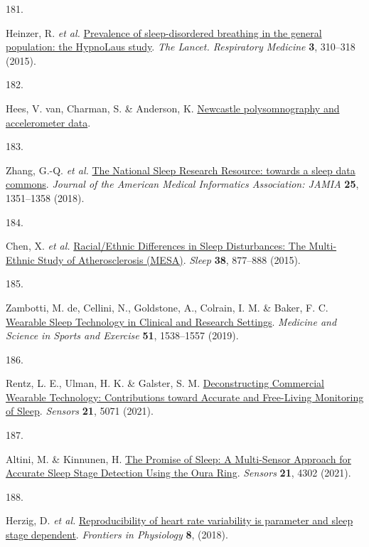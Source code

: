 \documentclass[
  10pt,
]{scrbook}
\newlength{\cslhangindent}
\newlength{\csllabelwidth}
\newlength{\cslentryspacingunit} %
\newenvironment{CSLReferences}[2] %
 {%
  \setlength{\parindent}{0pt}
  \ifodd #1
  \let\oldpar\par
  \def\par{\hangindent=\cslhangindent\oldpar}
  \fi
  \setlength{\parskip}{#2\cslentryspacingunit}
 }%
 {}
\newcommand{\CSLLeftMargin}[1]{\parbox[t]{\csllabelwidth}{#1}}
\newcommand{\CSLRightInline}[1]{\parbox[t]{\linewidth - \csllabelwidth}{#1}\break}
\let\originaltextbf\textbf
\renewcommand{\textbf}[1]{\textcolor{color1}{\textsf{\originaltextbf{#1}}}}
\begin{document}
\begin{CSLReferences}{0}{0}
\leavevmode{}%
\CSLLeftMargin{181. }%
\CSLRightInline{Heinzer, R. \emph{et al.}
\href{https://doi.org/10.1016/S2213-2600(15)00043-0}{Prevalence of
sleep-disordered breathing in the general population: the HypnoLaus
study}. \emph{The Lancet. Respiratory Medicine} \textbf{3}, 310--318
(2015).}

\leavevmode{}%
\CSLLeftMargin{182. }%
\CSLRightInline{Hees, V. van, Charman, S. \& Anderson, K.
\href{https://doi.org/10.5281/zenodo.1160410}{Newcastle polysomnography
and accelerometer data}.}

\leavevmode{}%
\CSLLeftMargin{183. }%
\CSLRightInline{Zhang, G.-Q. \emph{et al.}
\href{https://doi.org/10.1093/jamia/ocy064}{The National Sleep Research
Resource: towards a sleep data commons}. \emph{Journal of the American
Medical Informatics Association: JAMIA} \textbf{25}, 1351--1358 (2018).}

\leavevmode{}%
\CSLLeftMargin{184. }%
\CSLRightInline{Chen, X. \emph{et al.}
\href{https://doi.org/10.5665/sleep.4732}{Racial/Ethnic Differences in
Sleep Disturbances: The Multi-Ethnic Study of Atherosclerosis (MESA)}.
\emph{Sleep} \textbf{38}, 877--888 (2015).}

\leavevmode{}%
\CSLLeftMargin{185. }%
\CSLRightInline{Zambotti, M. de, Cellini, N., Goldstone, A., Colrain, I.
M. \& Baker, F. C.
\href{https://doi.org/10.1249/MSS.0000000000001947}{Wearable Sleep
Technology in Clinical and Research Settings}. \emph{Medicine and
Science in Sports and Exercise} \textbf{51}, 1538--1557 (2019).}

\leavevmode{}%
\CSLLeftMargin{186. }%
\CSLRightInline{Rentz, L. E., Ulman, H. K. \& Galster, S. M.
\href{https://doi.org/10.3390/s21155071}{Deconstructing Commercial
Wearable Technology: Contributions toward Accurate and Free-Living
Monitoring of Sleep}. \emph{Sensors} \textbf{21}, 5071 (2021).}

\leavevmode{}%
\CSLLeftMargin{187. }%
\CSLRightInline{Altini, M. \& Kinnunen, H.
\href{https://doi.org/10.3390/s21134302}{The Promise of Sleep: A
Multi-Sensor Approach for Accurate Sleep Stage Detection Using the Oura
Ring}. \emph{Sensors} \textbf{21}, 4302 (2021).}

\leavevmode{}%
\CSLLeftMargin{188. }%
\CSLRightInline{Herzig, D. \emph{et al.}
\href{https://www.frontiersin.org/articles/10.3389/fphys.2017.01100}{Reproducibility
of heart rate variability is parameter and sleep stage dependent}.
\emph{Frontiers in Physiology} \textbf{8}, (2018).}


\end{CSLReferences}
\end{document}
